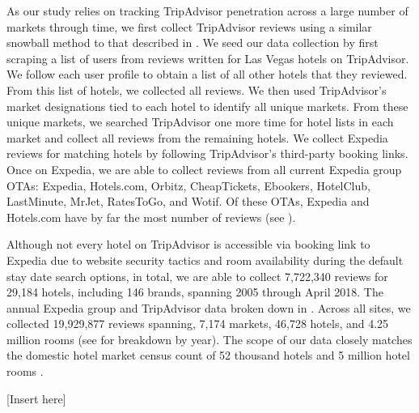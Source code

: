 \documentclass[mksc,blindrev]{informs3} %
\begin{document}

As our study relies on tracking TripAdvisor penetration across a large number of markets through time, we first collect TripAdvisor reviews using a similar snowball method to that described in \citet{wang2018and}. We seed our data collection by first scraping a list of users from reviews written for Las Vegas hotels on TripAdvisor. We follow each user profile to obtain a list of all other hotels that they reviewed. From this list of hotels, we collected all reviews. We then used TripAdvisor's market designations tied to each hotel to identify all unique markets. From these unique markets, we searched TripAdvisor one more time for hotel lists in each market and collect all reviews from the remaining hotels. We collect Expedia reviews for matching hotels by following TripAdvisor's third-party booking links. Once on Expedia, we are able to collect reviews from all current Expedia group OTAs: Expedia, Hotels.com, Orbitz, CheapTickets, Ebookers, HotelClub, LastMinute, MrJet, RatesToGo, and Wotif. Of these OTAs, Expedia and Hotels.com have by far the most number of reviews (see ).

Although not every hotel on TripAdvisor is accessible via booking link to Expedia due to website security tactics and room availability during the default stay date search options, in total, we are able to collect 7,722,340 reviews for 29,184 hotels, including 146 brands, spanning 2005 through April 2018. The annual Expedia group and TripAdvisor data broken down in . Across all sites, we collected 19,929,877 reviews spanning, 7,174 markets, 46,728 hotels, and 4.25 million rooms (see  for breakdown by year). The scope of our data closely matches the domestic hotel market census count of 52 thousand hotels and 5 million hotel rooms \citep{hotelnews2015}. 


[Insert  here]
\end{document}
